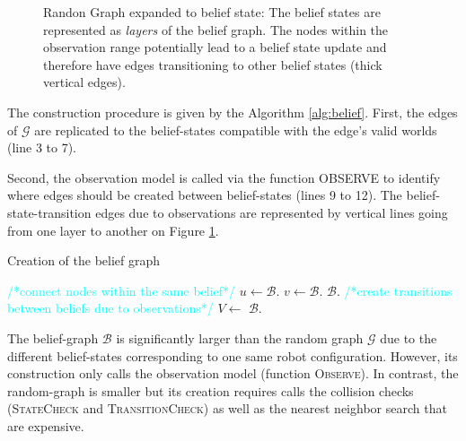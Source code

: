 \documentclass[letterpaper, 10 pt, conference]{ieeeconf}  %
\begin{document}
\begin{figure}[!htb]
 \caption{Randon Graph expanded to belief state: The belief states are represented as \textit{layers} of the belief graph. The nodes within the observation range potentially lead to a belief state update and therefore have edges transitioning to other belief states (thick vertical edges).}
 \label{fig:belief_layers}
\end{figure}

The construction procedure is given by the Algorithm \ref{alg:belief}. First, the edges of $\mathcal{G}$ are replicated to the belief-states compatible with the edge's valid worlds (line 3 to 7).

Second, the observation model is called via the function \textsc{OBSERVE} to identify where edges should be created between belief-states (lines 9 to 12). The belief-state-transition edges due to observations are represented by vertical lines going from one layer to another on Figure \ref{fig:belief_layers}.

\begin{algorithm}[H]
\caption{Creation of the belief graph}
\label{alg:belief}
\begin{algorithmic}[1]
	\State \textcolor{cyan}{\footnotesize/*connect nodes within the same belief*/}
			\State $u \gets \mathcal{B}$.
			\State $v \gets \mathcal{B}$.
			\State $\mathcal{B}$.
		\EndFor
	\EndFor
	\State \textcolor{cyan}{\footnotesize/*create transitions between beliefs due to observations*/}
	   	\State $V \gets$ 
			\State $\mathcal{B}$.
		\EndFor
	\EndFor
\EndFunction
\end{algorithmic}
\end{algorithm}

The belief-graph $\mathcal{B}$ is significantly larger than the random graph $\mathcal{G}$ due to the different belief-states corresponding to one same robot configuration. However, its construction only calls the observation model (function \textsc{Observe}). In contrast, the random-graph is smaller but its creation requires calls the collision checks (\textsc{StateCheck} and \textsc{TransitionCheck}) as well as the nearest neighbor search that are expensive.
\end{document}
